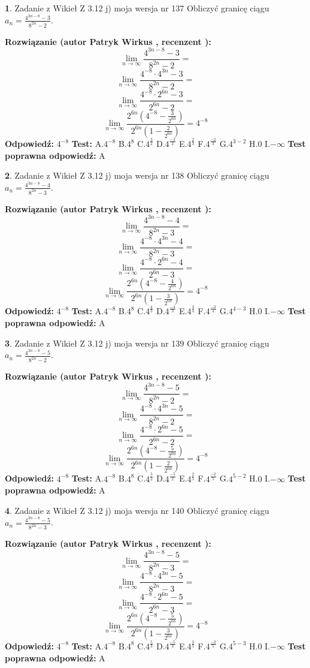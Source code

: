 \documentclass[12pt, a4paper]{article}
\theoremstyle{definition} %
\newtheorem{zad}{}
\newcommand{\zadStart}[1]{\begin{zad}#1\newline}
\newcommand{\zadStop}{\end{zad}}
\newcommand{\rozwStart}[2]{\noindent \textbf{Rozwiązanie (autor #1 , recenzent #2): }\newline}
\newcommand{\rozwStop}{\newline}
\newcommand{\odpStart}{\noindent \textbf{Odpowiedź:}\newline}
\newcommand{\odpStop}{\newline}
\newcommand{\testStart}{\noindent \textbf{Test:}\newline}
\newcommand{\testStop}{\newline}
\newcommand{\kluczStart}{\noindent \textbf{Test poprawna odpowiedź:}\newline}
\newcommand{\kluczStop}{\newline}
\begin{document}
\zadStart{Zadanie z Wikieł Z 3.12 j) moja wersja nr 137}
Obliczyć granicę ciągu $a_{n}=\frac{4^{3n-8}-3}{8^{2n}-2}$.
\zadStop
\rozwStart{Patryk Wirkus}{}
$$\lim\limits_{n\to\infty}\frac{4^{3n-8}-3}{8^{2n}-2}=$$
$$\lim\limits_{n\to\infty}\frac{4^{-8} \cdot 4^{3n}-3}{8^{2n}-2}=$$
$$\lim\limits_{n\to\infty}\frac{4^{-8} \cdot 2^{6n}-3}{2^{6n}-2}=$$
$$\lim\limits_{n\to\infty}\frac{2^{6n}(4^{-8} - \frac{3}{2^{6n}})}{2^{6n}(1-\frac{2}{2^{6n}})}= 4^{-8}$$
\rozwStop
\odpStart
$4^{-8}$
\odpStop
\testStart
A.$4^{-8}$
B.$4^{8}$
C.$4^{\frac{3}{2}}$
D.$4^{\frac{-3}{2}}$
E.$4^{\frac{2}{3}}$
F.$4^{\frac{-2}{3}}$
G.$4^{3-2}$
H.$0$
I.$-\infty$
\testStop
\kluczStart
A
\kluczStop



\zadStart{Zadanie z Wikieł Z 3.12 j) moja wersja nr 138}
Obliczyć granicę ciągu $a_{n}=\frac{4^{3n-8}-4}{8^{2n}-3}$.
\zadStop
\rozwStart{Patryk Wirkus}{}
$$\lim\limits_{n\to\infty}\frac{4^{3n-8}-4}{8^{2n}-3}=$$
$$\lim\limits_{n\to\infty}\frac{4^{-8} \cdot 4^{3n}-4}{8^{2n}-3}=$$
$$\lim\limits_{n\to\infty}\frac{4^{-8} \cdot 2^{6n}-4}{2^{6n}-3}=$$
$$\lim\limits_{n\to\infty}\frac{2^{6n}(4^{-8} - \frac{4}{2^{6n}})}{2^{6n}(1-\frac{3}{2^{6n}})}= 4^{-8}$$
\rozwStop
\odpStart
$4^{-8}$
\odpStop
\testStart
A.$4^{-8}$
B.$4^{8}$
C.$4^{\frac{4}{3}}$
D.$4^{\frac{-4}{3}}$
E.$4^{\frac{3}{4}}$
F.$4^{\frac{-3}{4}}$
G.$4^{4-3}$
H.$0$
I.$-\infty$
\testStop
\kluczStart
A
\kluczStop



\zadStart{Zadanie z Wikieł Z 3.12 j) moja wersja nr 139}
Obliczyć granicę ciągu $a_{n}=\frac{4^{3n-8}-5}{8^{2n}-2}$.
\zadStop
\rozwStart{Patryk Wirkus}{}
$$\lim\limits_{n\to\infty}\frac{4^{3n-8}-5}{8^{2n}-2}=$$
$$\lim\limits_{n\to\infty}\frac{4^{-8} \cdot 4^{3n}-5}{8^{2n}-2}=$$
$$\lim\limits_{n\to\infty}\frac{4^{-8} \cdot 2^{6n}-5}{2^{6n}-2}=$$
$$\lim\limits_{n\to\infty}\frac{2^{6n}(4^{-8} - \frac{5}{2^{6n}})}{2^{6n}(1-\frac{2}{2^{6n}})}= 4^{-8}$$
\rozwStop
\odpStart
$4^{-8}$
\odpStop
\testStart
A.$4^{-8}$
B.$4^{8}$
C.$4^{\frac{5}{2}}$
D.$4^{\frac{-5}{2}}$
E.$4^{\frac{2}{5}}$
F.$4^{\frac{-2}{5}}$
G.$4^{5-2}$
H.$0$
I.$-\infty$
\testStop
\kluczStart
A
\kluczStop



\zadStart{Zadanie z Wikieł Z 3.12 j) moja wersja nr 140}
Obliczyć granicę ciągu $a_{n}=\frac{4^{3n-8}-5}{8^{2n}-3}$.
\zadStop
\rozwStart{Patryk Wirkus}{}
$$\lim\limits_{n\to\infty}\frac{4^{3n-8}-5}{8^{2n}-3}=$$
$$\lim\limits_{n\to\infty}\frac{4^{-8} \cdot 4^{3n}-5}{8^{2n}-3}=$$
$$\lim\limits_{n\to\infty}\frac{4^{-8} \cdot 2^{6n}-5}{2^{6n}-3}=$$
$$\lim\limits_{n\to\infty}\frac{2^{6n}(4^{-8} - \frac{5}{2^{6n}})}{2^{6n}(1-\frac{3}{2^{6n}})}= 4^{-8}$$
\rozwStop
\odpStart
$4^{-8}$
\odpStop
\testStart
A.$4^{-8}$
B.$4^{8}$
C.$4^{\frac{5}{3}}$
D.$4^{\frac{-5}{3}}$
E.$4^{\frac{3}{5}}$
F.$4^{\frac{-3}{5}}$
G.$4^{5-3}$
H.$0$
I.$-\infty$
\testStop
\kluczStart
A
\kluczStop
\end{document}
